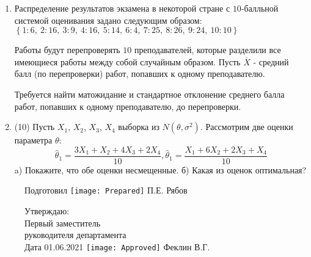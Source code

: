 \documentclass[a4paper,10pt]{article}
\begin{document}
\begin{enumerate}
\item

    
    	Распределение результатов экзамена в некоторой стране с $10$-балльной системой оценивания задано следующим образом:
    	$\left\{ 1 : 6, \  2 : 16, \  3 : 9, \  4 : 16, \  5 : 14, \  6 : 4, \  7 : 25, \  8 : 26, \  9 : 24, \  10 : 10\right\}$

	Работы будут перепроверять $10$ преподавателей, которые разделили все имеющиеся работы между собой случайным образом. Пусть $\overline{X}$ - средний балл (по перепроверки) работ, попавших к одному преподавателю.

	Требуется найти матожидание и стандартное отклонение среднего балла работ, попавших к одному преподавателю, до перепроверки.
    

\item


(10) Пусть $X _{1}$, $X _{2}$, $X _{3}$, $X _{4}$ выборка из $N(\theta, \sigma ^{2})$. Рассмотрим две оценки параметра $\theta$:
\[\hat \theta _{1} = \frac{3X _{1} + X _{2} + 4X _{3} + 2X _{4}}{10}, \hat \theta _{1} = \frac{X _{1} + 6X _{2} + 2X _{3} + X _{4}}{10}\]
a) Покажите, что обе оценки несмещенные.
б) Какая из оценок оптимальная?


\end{enumerate}

\begin{figure}[H]
	Подготовил
	\hfill
	\texttt{[image: Prepared]}
	П.Е. Рябов
\end{figure}


\begin{figure}[H]
	Утверждаю:\\
	Первый заместитель\\
	руководителя департамента\\
	Дата 01.06.2021
	\hfill
	\texttt{[image: Approved]}
	Феклин В.Г.
\end{figure}
\end{document}
